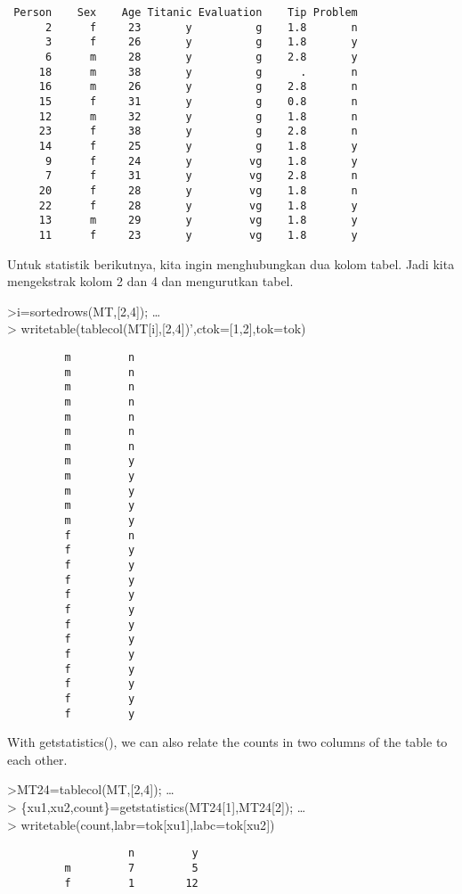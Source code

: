 \documentclass[
]{book}
\begin{document}
\begin{verbatim}
 Person    Sex    Age Titanic Evaluation    Tip Problem
      2      f     23       y          g    1.8       n
      3      f     26       y          g    1.8       y
      6      m     28       y          g    2.8       y
     18      m     38       y          g      .       n
     16      m     26       y          g    2.8       n
     15      f     31       y          g    0.8       n
     12      m     32       y          g    1.8       n
     23      f     38       y          g    2.8       n
     14      f     25       y          g    1.8       y
      9      f     24       y         vg    1.8       y
      7      f     31       y         vg    2.8       n
     20      f     28       y         vg    1.8       n
     22      f     28       y         vg    1.8       y
     13      m     29       y         vg    1.8       y
     11      f     23       y         vg    1.8       y
\end{verbatim}

Untuk statistik berikutnya, kita ingin menghubungkan dua kolom tabel. Jadi kita mengekstrak kolom 2 dan 4 dan mengurutkan tabel.

\textgreater i=sortedrows(MT,{[}2,4{]}); \ldots{}\\
\textgreater{} writetable(tablecol(MT{[}i{]},{[}2,4{]})',ctok={[}1,2{]},tok=tok)

\begin{verbatim}
         m         n
         m         n
         m         n
         m         n
         m         n
         m         n
         m         n
         m         y
         m         y
         m         y
         m         y
         m         y
         f         n
         f         y
         f         y
         f         y
         f         y
         f         y
         f         y
         f         y
         f         y
         f         y
         f         y
         f         y
         f         y
\end{verbatim}

With getstatistics(), we can also relate the counts in two columns of the table to each other.

\textgreater MT24=tablecol(MT,{[}2,4{]}); \ldots{}\\
\textgreater{} \{xu1,xu2,count\}=getstatistics(MT24{[}1{]},MT24{[}2{]}); \ldots{}\\
\textgreater{} writetable(count,labr=tok{[}xu1{]},labc=tok{[}xu2{]})

\begin{verbatim}
                   n         y
         m         7         5
         f         1        12
\end{verbatim}
\end{document}
